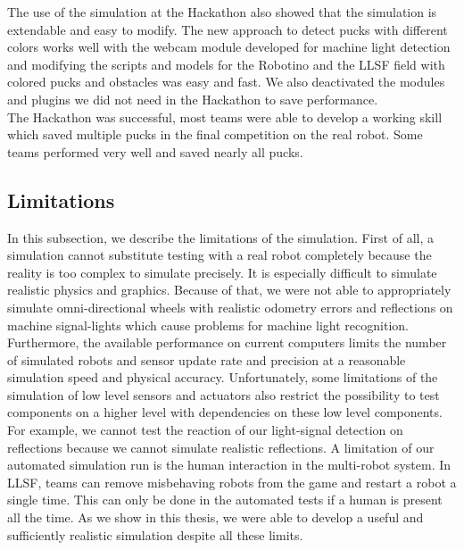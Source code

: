 The use of the simulation at the Hackathon also showed that the simulation is extendable and easy to modify. The new approach to detect pucks with different colors works well with the webcam module developed for machine light detection and modifying the scripts and  models for the Robotino and the LLSF field with colored pucks and obstacles was easy and fast. We also deactivated the modules and plugins we did not need in the Hackathon to save performance.\\
The Hackathon was successful, most teams were able to develop a working skill which saved multiple pucks in the final competition on the real robot. Some teams performed very well and saved nearly all pucks.

\subsection{Limitations}
In this subsection, we describe the limitations of the simulation. First of all, a simulation cannot substitute testing with a real robot completely because the reality is too complex to simulate precisely. It is especially difficult to simulate realistic physics and graphics. Because of that, we were not able to appropriately simulate omni-directional wheels with realistic odometry errors and reflections on machine signal-lights which cause problems for machine light recognition. Furthermore, the available performance on current computers limits the number of simulated robots and sensor update rate and precision at a reasonable simulation speed and physical accuracy. Unfortunately, some limitations of the simulation of low level sensors and actuators also restrict the possibility to test components on a higher level with dependencies on these low level components. For example, we cannot test the reaction of our light-signal detection on reflections because we cannot simulate realistic reflections. A limitation of our automated simulation run is the human interaction in the multi-robot system. In LLSF, teams can remove misbehaving robots from the game and restart a robot a single time. This can only be done in the automated tests if a human is present all the time. As we show in this thesis, we were able to develop a useful and sufficiently realistic simulation despite all these limits.\\

